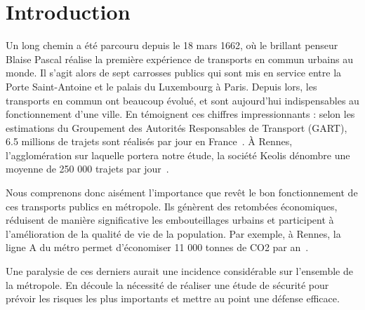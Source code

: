 \section{Introduction}
	Un long chemin a été parcouru depuis le 18 mars 1662, où le brillant penseur Blaise Pascal réalise la première expérience de transports en commun urbains au monde. Il s'agit alors de sept carrosses publics qui sont mis en service entre la Porte Saint-Antoine et le palais du Luxembourg à Paris. Depuis lors, les transports en commun ont beaucoup évolué, et sont aujourd'hui indispensables au fonctionnement d'une ville. En témoignent ces chiffres impressionnants : selon les estimations du Groupement des Autorités Responsables de Transport (GART), 6.5 millions de trajets sont réalisés par jour en France~\cite{Gart}. \`A Rennes, l'agglomération sur laquelle portera notre étude, la société Keolis dénombre une moyenne de 250 000 trajets par jour~\cite{Keolis}. 

	Nous comprenons donc aisément l'importance que revêt le bon fonctionnement de ces transports publics en métropole. Ils génèrent des retombées économiques, réduisent de manière significative les embouteillages urbains et participent à l’amélioration de la qualité de vie de la population. Par exemple, à Rennes, la ligne A du métro permet d'économiser 11 000 tonnes de CO2 par an~\cite{bilanLA}. 

	Une paralysie de ces derniers aurait une incidence considérable sur l'ensemble de la métropole. En découle la nécessité de réaliser une étude de sécurité pour prévoir les risques les plus importants et mettre au point une défense efficace. 

























